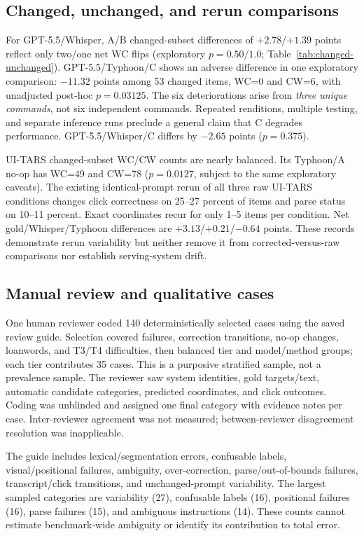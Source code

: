 \subsection{Changed, unchanged, and rerun comparisons}

For GPT-5.5/Whisper, A/B changed-subset differences of $+2.78$/$+1.39$ points reflect only two/one net WC flips (exploratory $p=0.50/1.0$; Table~\ref{tab:changed-unchanged}). GPT-5.5/Typhoon/C shows an adverse difference in one exploratory comparison: $-11.32$ points among 53 changed items, WC=0 and CW=6, with unadjusted post-hoc $p=0.03125$. The six deteriorations arise from \emph{three unique commands}, not six independent commands. Repeated renditions, multiple testing, and separate inference runs preclude a general claim that C degrades performance. GPT-5.5/Whisper/C differs by $-2.65$ points ($p=0.375$).

UI-TARS changed-subset WC/CW counts are nearly balanced. Its Typhoon/A no-op has WC=49 and CW=78 ($p=0.0127$, subject to the same exploratory caveats). The existing identical-prompt rerun of all three raw UI-TARS conditions changes click correctness on 25--27 percent of items and parse status on 10--11 percent. Exact coordinates recur for only 1--5 items per condition. Net gold/Whisper/Typhoon differences are $+3.13$/$+0.21$/$-0.64$ points. These records demonstrate rerun variability but neither remove it from corrected-versus-raw comparisons nor establish serving-system drift.



\subsection{Manual review and qualitative cases}

One human reviewer coded 140 deterministically selected cases using the saved review guide. Selection covered failures, correction transitions, no-op changes, loanwords, and T3/T4 difficulties, then balanced tier and model/method groups; each tier contributes 35 cases. This is a purposive stratified sample, not a prevalence sample. The reviewer saw system identities, gold targets/text, automatic candidate categories, predicted coordinates, and click outcomes. Coding was unblinded and assigned one final category with evidence notes per case. Inter-reviewer agreement was not measured; between-reviewer disagreement resolution was inapplicable.

The guide includes lexical/segmentation errors, confusable labels, visual/positional failures, ambiguity, over-correction, parse/out-of-bounds failures, transcript/click transitions, and unchanged-prompt variability. The largest sampled categories are variability (27), confusable labels (16), positional failures (16), parse failures (15), and ambiguous instructions (14). These counts cannot estimate benchmark-wide ambiguity or identify its contribution to total error.

